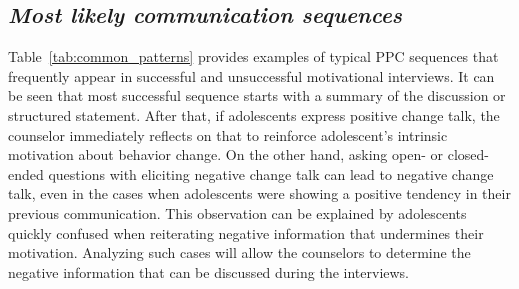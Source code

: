 \documentclass{amia_summit_2018}
\begin{document}
\subsection*{\textit{Most likely communication sequences}}
Table~\ref{tab:common_patterns} provides examples of typical PPC sequences that frequently appear in successful and unsuccessful motivational interviews. It can be seen that most successful sequence starts with a summary of the discussion or structured statement. After that, if adolescents express positive change talk, the counselor immediately reflects on that to reinforce adolescent's intrinsic motivation about behavior change. On the other hand, asking open- or closed-ended questions with eliciting negative change talk can lead to negative change talk, even in the cases when adolescents were showing a positive tendency in their previous communication. This observation can be explained by adolescents quickly confused when reiterating negative information that undermines their motivation. Analyzing such cases will allow the counselors to determine the negative information that can be discussed during the interviews.
\end{document}
